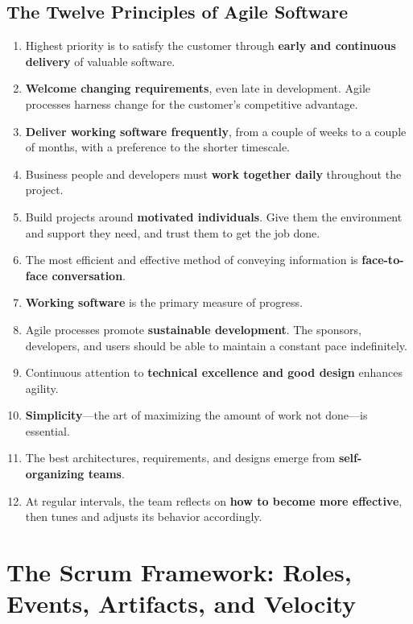 \subsection{The Twelve Principles of Agile Software}
\begin{enumerate}
    \item Highest priority is to satisfy the customer through \textbf{early and continuous delivery} of valuable software.
    \item \textbf{Welcome changing requirements}, even late in development. Agile processes harness change for the customer's competitive advantage.
    \item \textbf{Deliver working software frequently}, from a couple of weeks to a couple of months, with a preference to the shorter timescale.
    \item Business people and developers must \textbf{work together daily} throughout the project.
    \item Build projects around \textbf{motivated individuals}. Give them the environment and support they need, and trust them to get the job done.
    \item The most efficient and effective method of conveying information is \textbf{face-to-face conversation}.
    \item \textbf{Working software} is the primary measure of progress.
    \item Agile processes promote \textbf{sustainable development}. The sponsors, developers, and users should be able to maintain a constant pace indefinitely.
    \item Continuous attention to \textbf{technical excellence and good design} enhances agility.
    \item \textbf{Simplicity}---the art of maximizing the amount of work not done---is essential.
    \item The best architectures, requirements, and designs emerge from \textbf{self-organizing teams}.
    \item At regular intervals, the team reflects on \textbf{how to become more effective}, then tunes and adjusts its behavior accordingly.
\end{enumerate}

\section{The Scrum Framework: Roles, Events, Artifacts, and Velocity}
\label{sec:se_scrum_framework}

